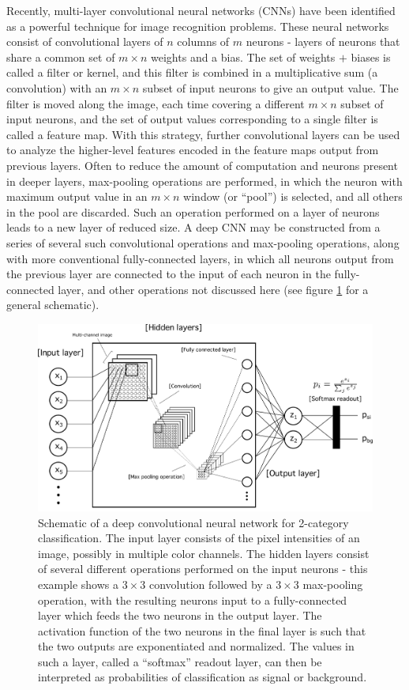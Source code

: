 \documentclass[a4paper,11pt]{article}
\begin{document}
Recently, multi-layer convolutional neural networks (CNNs) have been identified as a powerful technique for image recognition problems.  These neural networks consist of
convolutional layers of $n$ columns of $m$ neurons - layers of neurons that share a common set of $m\times n$ weights and a bias.  The set of 
weights $+$ biases is called a filter or kernel, and this filter is combined in a multiplicative sum (a convolution) with an $m\times n$ subset of input neurons to give an output value.  The filter
is moved along the image, each time covering a different $m\times n$ subset of input neurons, and the set of output values corresponding to a single filter is called a feature map.  With this
strategy, further convolutional layers can be used to analyze the higher-level features encoded in the feature maps output
from previous layers.  Often to reduce the amount of computation and neurons present in deeper layers, max-pooling operations are performed, in which the neuron with maximum output
value in an $m\times n$ window (or ``pool'') is selected, and all others in the pool are discarded.  Such an operation performed on a layer of neurons leads to a new layer of reduced size.
A deep CNN may be constructed from a series of several such convolutional operations and max-pooling operations, along with more conventional fully-connected layers, in which all neurons 
output from the previous layer are connected to the input of each neuron in the fully-connected layer, and other operations not discussed here (see figure \ref{fig.generalnn} for a general 
schematic).

\begin{figure}[!htb]
	\centering
	\includegraphics[scale = 0.6]{fig/general_nn.pdf}
	\caption{Schematic of a deep convolutional neural network for 2-category classification.  The input layer consists of the pixel intensities of an image, possibly in multiple color channels.  The 
		hidden layers consist of several different operations performed on the input neurons - this example shows a $3 \times 3$ convolution followed by a $3 \times 3$ max-pooling operation, 
		with the resulting neurons input to a fully-connected layer which feeds the two neurons in the output layer.  The activation function of the two neurons in the final layer is such that the two outputs are exponentiated and normalized.  The values in such a layer, called a ``softmax'' readout layer, can then be interpreted as probabilities of classification as
		signal or background.} \label{fig.generalnn}
\end{figure}
\end{document}
